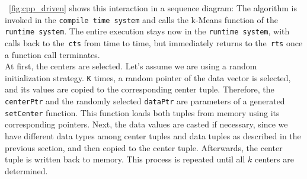 ~\autoref{fig:cpp_driven} shows this interaction in a sequence diagram: The algorithm is invoked in the \texttt{compile time system} and calls the k-Means function of the \texttt{runtime system}. The entire execution stays now in the \texttt{runtime system}, with calls back to the~\texttt{cts} from time to time, but immediately returns to the~\texttt{rts} once a function call terminates. 
\\
At first, the centers are selected. Let’s assume we are using a random initialization strategy. \texttt{K} times, a random pointer of the data vector is selected, and its values are copied to the corresponding center tuple. Therefore, the \texttt{centerPtr} and the randomly selected \texttt{dataPtr} are parameters of a generated \texttt{setCenter} function. This function loads both tuples from memory using its corresponding pointers. Next, the data values are casted if necessary, since we have different data types among center tuples and data tuples as described in the previous section, and then copied to the center tuple. Afterwards, the center tuple is written back to memory. This process is repeated until all $k$ centers are determined.

